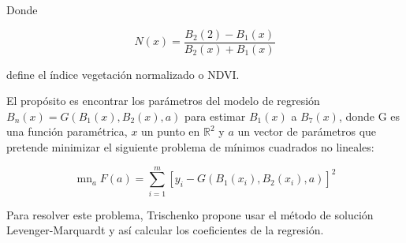 Donde 

\begin{equation}
N(x) =  \frac{B_{2}(2)-B_{1}(x)}{B_{2}(x) + B_{1}(x)}
\end{equation}

define el índice vegetación normalizado o NDVI.

El propósito es encontrar los parámetros del modelo de regresión $B_{n}(x) = G(B_{1}(x), B_{2}(x), a)$ para estimar $B_{1}(x)$ a $B_{7}(x)$, donde G es una función paramétrica, $x$ un punto en $\mathbb{R}^{2}$ y $a$ un vector de parámetros que pretende minimizar el siguiente problema de mínimos cuadrados no lineales: 

\begin{equation}
\mathop{m\acute{i}n}_{a} F(a) = \sum_{i=1}^{m} [y_{i} - G(B_{1}(x_{i}), B_{2}(x_{i}),a)]^{2}
\end{equation}

Para resolver este problema, Trischenko propone usar el método de solución Levenger-Marquardt y así calcular los coeficientes de la regresión. 


